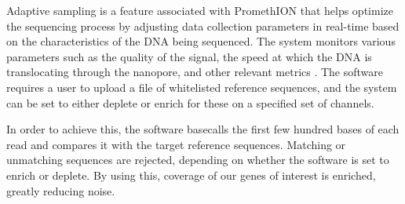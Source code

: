 Adaptive sampling is a feature associated with PromethION that helps optimize the sequencing process by adjusting data collection parameters in real-time based on the characteristics of the DNA being sequenced. The system monitors various parameters such as the quality of the signal, the speed at which the DNA is translocating through the nanopore, and other relevant metrics \citep{ont_as}. The software requires a user to upload a file of whitelisted reference sequences, and the system can be set to either deplete or enrich for these on a specified set of channels. 

In order to achieve this, the software basecalls the first few hundred bases of each read and compares it with the target reference sequences. Matching or unmatching sequences are rejected, depending on whether the software is set to enrich or deplete. By using this, coverage of our genes of interest is enriched, greatly reducing noise.